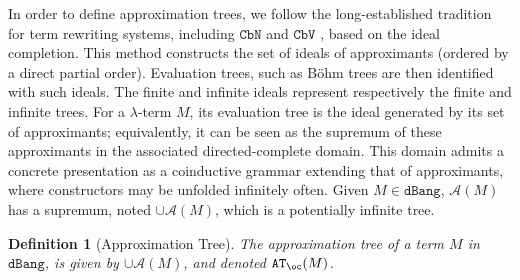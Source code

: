 \documentclass[10pt,a4paper]{article}
\newtheorem{definition}[theorem]{Definition}
\newcommand{\<}{\langle}
\renewcommand{\>}{\rangle}
\newcommand{\cbn}{\ensuremath{\mathtt{CbN}}}
\newcommand{\cbv}{\ensuremath{\mathtt{CbV}}}
\newcommand{\dbang}{\ensuremath{\mathtt{dBang}}}
\newcommand{\mcal}[1]{\ensuremath{\mathcal{#1}}}
\newcommand{\setApprox}{\mcal{A}}
\newcommand{\btb}{\ensuremath{{\tt{AT}_\oc}}}
\begin{document}
In order to define approximation trees, we follow the long-established tradition for term
rewriting systems, including \cbn{} and \cbv{} \cite{Ariola70, Boudol83,Barendregt84,
Amadio98, Ariola02, kerinec:bohmTreeCbV}, based on the ideal completion. 
This method constructs the set of ideals of approximants (ordered by a
direct partial order). Evaluation trees, such as Böhm trees are then identified with such ideals.
The finite and infinite ideals represent respectively the finite and
infinite trees. For a $\lambda$-term $M$, its evaluation tree is the ideal
generated by its set of approximants; equivalently, it can be seen as
the supremum of these approximants in the associated directed-complete
domain.
This domain admits a concrete presentation as a coinductive grammar extending
that of approximants, where constructors may be unfolded infinitely often.
%
Given $M \in \dbang$, $\setApprox(M)$ has a supremum, noted $\cup\setApprox(M)$,
which is a potentially infinite tree.
\begin{definition}[Approximation Tree]
	The approximation tree of a term $M$ in $\dbang$, is given by
	$\cup\setApprox(M)$, and denoted $\btb(M)$.
\end{definition}
\end{document}
